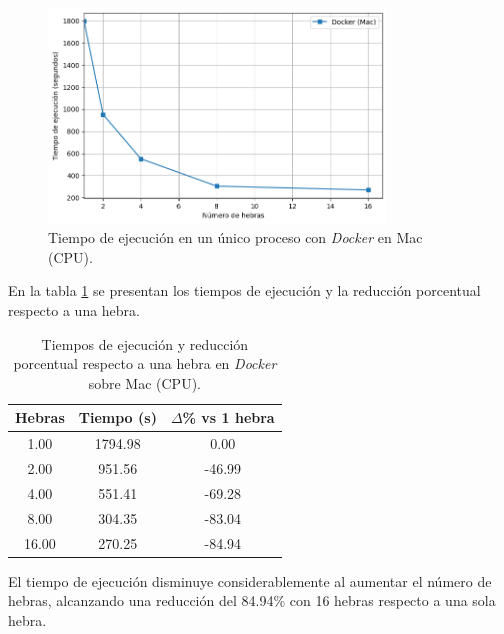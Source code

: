 \begin{figure}[H]
    \centering
    \includegraphics[width=0.8\textwidth]{imagenes/cap5/single-node_mac_docker_time.png}
    \caption{Tiempo de ejecución en un único proceso con \textit{Docker} en Mac (CPU).}
    \label{fig:single-node_mac_docker_time}
\end{figure}

En la tabla \ref{tab:single-node_mac_docker_time} se presentan los tiempos de ejecución y la reducción porcentual respecto a una hebra.

\begin{table}[ht]
    \centering
    \begin{tabular}{|c|c|c|}
        \hline
        \textbf{Hebras} & \textbf{Tiempo (s)} & \textbf{$\Delta$\% vs 1 hebra} \\
        \hline
        1.00            & 1794.98             & 0.00                           \\
        2.00            & 951.56              & -46.99                         \\
        4.00            & 551.41              & -69.28                         \\
        8.00            & 304.35              & -83.04                         \\
        16.00           & 270.25              & -84.94                         \\
        \hline
    \end{tabular}
    \caption{Tiempos de ejecución y reducción porcentual respecto a una hebra en \textit{Docker} sobre Mac (CPU).}
    \label{tab:single-node_mac_docker_time}
\end{table}

El tiempo de ejecución disminuye considerablemente al aumentar el número de hebras, alcanzando una reducción del 84.94\% con 16 hebras respecto a una sola hebra.

